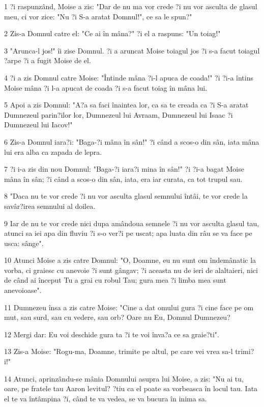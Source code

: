 \par 1 ?i raspunzând, Moise a zis: "Dar de nu ma vor crede ?i nu vor asculta de glasul meu, ci vor zice: "Nu ?i S-a aratat Domnul!", ce sa le spun?"
\par 2 Zis-a Domnul catre el: "Ce ai în mâna?" ?i el a raspuns: "Un toiag!"
\par 3 "Arunca-l jos!" îi zise Domnul. ?i a aruncat Moise toiagul jos ?i s-a facut toiagul ?arpe ?i a fugit Moise de el.
\par 4 ?i a zis Domnul catre Moise: "Întinde mâna ?i-l apuca de coada!" ?i ?i-a întins Moise mâna ?i l-a apucat de coada ?i s-a facut toiag în mâna lui.
\par 5 Apoi a zis Domnul: "A?a sa faci înaintea lor, ca sa te creada ca ?i S-a aratat Dumnezeul parin?ilor lor, Dumnezeul lui Avraam, Dumnezeul lui Isaac ?i Dumnezeul lui Iacov!"
\par 6 Zis-a Domnul iara?i: "Baga-?i mâna în sân!" ?i când a scos-o din sân, iata mâna lui era alba ca zapada de lepra.
\par 7 ?i i-a zis din nou Domnul: "Baga-?i iara?i mina în sân!" ?i ?i-a bagat Moise mâna în sân; ?i când a scos-o din sân, iata, era iar curata, ca tot trupul sau.
\par 8 "Daca nu te vor crede ?i nu vor asculta glasul semnului întâi, te vor crede la savâr?irea semnului al doilea.
\par 9 Iar de nu te vor crede nici dupa amândoua semnele ?i nu vor asculta glasul tau, atunci sa iei apa din fluviu ?i s-o ver?i pe uscat; apa luata din râu se va face pe usca: sânge".
\par 10 Atunci Moise a zis catre Domnul: "O, Doamne, eu nu sunt om îndemânatic la vorba, ci graiesc cu anevoie ?i sunt gângav; ?i aceasta nu de ieri de alaltaieri, nici de când ai început Tu a grai cu robul Tau; gura mea ?i limba mea sunt anevoioase".
\par 11 Dumnezeu însa a zis catre Moise: "Cine a dat omului gura ?i cine face pe om mut, sau surd, sau cu vedere, sau orb? Oare nu Eu, Domnul Dumnezeu?
\par 12 Mergi dar: Eu voi deschide gura ta ?i te voi înva?a ce sa graie?ti".
\par 13 Zis-a Moise: "Rogu-ma, Doamne, trimite pe altul, pe care vei vrea sa-l trimi?i!"
\par 14 Atunci, aprinzându-se mânia Domnului asupra lui Moise, a zis: "Nu ai tu, oare, pe fratele tau Aaron levitul? ?tiu ca el poate sa vorbeasca în locul tau. Iata el te va întâmpina ?i, când te va vedea, se va bucura în inima sa.
